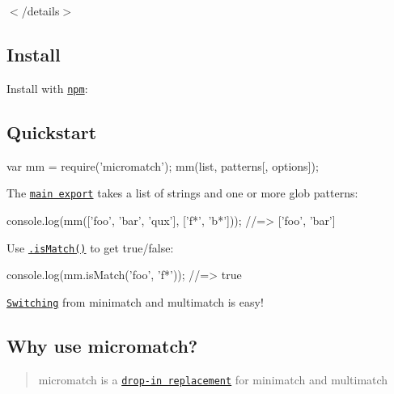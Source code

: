 $<$/details$>$

\subsection*{Install}

Install with \href{https://www.npmjs.com/}{\tt npm}\+:




\subsection*{Quickstart}


\begin{DoxyCode}
var mm = require('micromatch');
mm(list, patterns[, options]);
\end{DoxyCode}


The \href{#micromatch}{\tt main export} takes a list of strings and one or more glob patterns\+:


\begin{DoxyCode}
console.log(mm(['foo', 'bar', 'qux'], ['f*', 'b*'])); 
//=> ['foo', 'bar']
\end{DoxyCode}


Use \href{#ismatch}{\tt .is\+Match()} to get true/false\+:


\begin{DoxyCode}
console.log(mm.isMatch('foo', 'f*'));  
//=> true
\end{DoxyCode}


\href{#switching-to-micromatch}{\tt Switching} from minimatch and multimatch is easy!

\subsection*{Why use micromatch?}

\begin{quote}
micromatch is a \href{#switching-to-micromatch}{\tt drop-\/in replacement} for minimatch and multimatch \end{quote}



